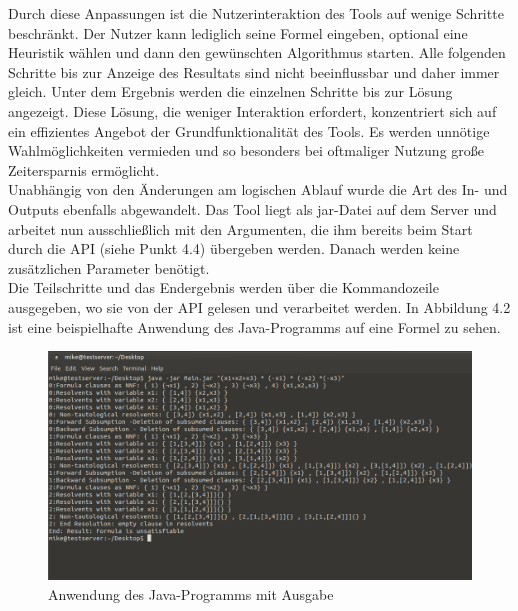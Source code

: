 Durch diese Anpassungen ist die Nutzerinteraktion des Tools auf wenige Schritte beschränkt. Der Nutzer kann lediglich seine Formel eingeben, optional eine Heuristik wählen und dann den gewünschten Algorithmus starten. Alle folgenden Schritte bis zur Anzeige des Resultats sind nicht beeinflussbar und daher immer gleich. Unter dem Ergebnis werden die einzelnen Schritte bis zur Lösung angezeigt. Diese Lösung, die weniger Interaktion erfordert, konzentriert sich auf ein effizientes Angebot der Grundfunktionalität des Tools. Es werden unnötige Wahlmöglichkeiten vermieden und so besonders bei oftmaliger Nutzung große Zeitersparnis ermöglicht.\\
Unabhängig von den Änderungen am logischen Ablauf wurde die Art des In- und Outputs ebenfalls abgewandelt. Das Tool liegt als jar-Datei auf dem Server und  arbeitet nun ausschließlich mit den Argumenten, die ihm bereits beim Start durch die API (siehe Punkt 4.4) übergeben werden. Danach werden keine zusätzlichen Parameter benötigt. \\
Die Teilschritte und das Endergebnis werden über die Kommandozeile ausgegeben, wo sie von der API gelesen und verarbeitet werden. In Abbildung 4.2 ist eine beispielhafte Anwendung des Java-Programms auf eine Formel zu sehen.
\begin{figure}[htb]
     \centerline{\includegraphics[width=14cm]{../Abbildungen/javaAusgabe.png}}
  \caption{Anwendung des Java-Programms mit Ausgabe \cite{eig}}
  \label{fig1_1}
\end{figure}\\\\

